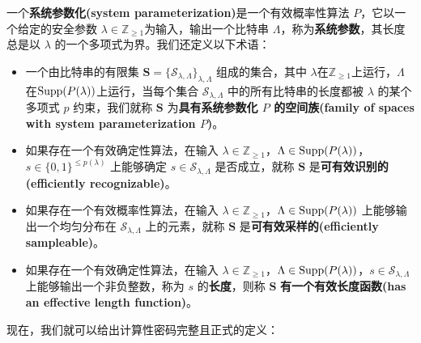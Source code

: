 \begin{definition}\label{def:2-9}
一个\textbf{系统参数化(system parameterization)}是一个有效概率性算法 $P$，它以一个给定的安全参数 $\lambda\in\mathbb{Z}_{\geq1}$为输入，输出一个比特串 $\Lambda$，称为\textbf{系统参数}，其长度总是以 $\lambda$ 的一个多项式为界。我们还定义以下术语：
\begin{itemize}
	\item 一个由比特串的有限集 $\mathbf{S}=\{\mathcal{S}_{\lambda,\Lambda}\}_{\lambda,\Lambda}$ 组成的集合，其中 $\lambda$在$\mathbb{Z}_{\geq1}$上运行，$\Lambda$在${\rm Supp}(P(\lambda))$上运行，当每个集合 $\mathcal{S}_{\lambda,\Lambda}$ 中的所有比特串的长度都被 $\lambda$ 的某个多项式 $p$ 约束，我们就称 $\mathbf{S}$ 为\textbf{具有系统参数化 $P$ 的空间族(family of spaces with system parameterization $P$)}。
	\item 如果存在一个有效确定性算法，在输入 $\lambda\in\mathbb{Z}_{\geq1}$，$\Lambda\in{\rm Supp}(P(\lambda))$，$s\in\{0,1\}^{\leq p(\lambda)}$ 上能够确定 $s\in\mathcal{S}_{\lambda,\Lambda}$ 是否成立，就称 $\mathbf{S}$ 是\textbf{可有效识别的(efficiently recognizable)}。
	\item 如果存在一个有效概率性算法，在输入 $\lambda\in\mathbb{Z}_{\geq1}$，$\Lambda\in{\rm Supp}(P(\lambda))$ 上能够输出一个均匀分布在 $\mathcal{S}_{\lambda,\Lambda}$ 上的元素，就称 $\mathbf{S}$ 是\textbf{可有效采样的(efficiently sampleable)}。
	\item 如果存在一个有效确定性算法，在输入 $\lambda\in\mathbb{Z}_{\geq1}$，$\Lambda\in{\rm Supp}(P(\lambda))$，$s\in\mathcal{S}_{\lambda,\Lambda}$ 上能够输出一个非负整数，称为 $s$ 的\textbf{长度}，则称 $\mathbf{S}$ \textbf{有一个有效长度函数(has an effective length function)}。
\end{itemize}
\end{definition}

现在，我们就可以给出计算性密码完整且正式的定义：

